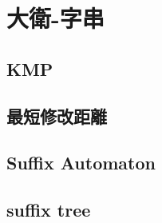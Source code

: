\section{大衛-字串}
\subsection{KMP}
\raggedbottom
\hrulefill
\subsection{最短修改距離}
\raggedbottom
\hrulefill
\subsection{Suffix Automaton}
\raggedbottom
\hrulefill
\subsection{suffix tree}
\raggedbottom
\hrulefill

